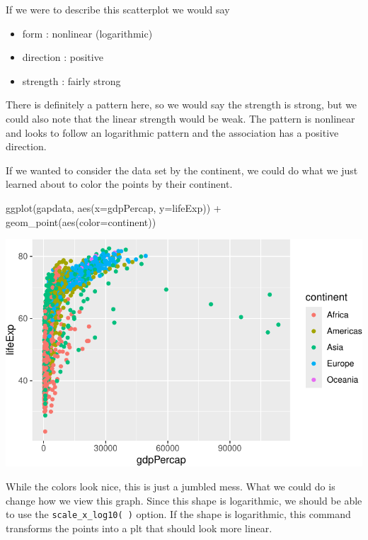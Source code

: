 \documentclass[
  letterpaper,
  DIV=11,
  numbers=noendperiod]{scrreprt}
\newenvironment{Shaded}{\begin{snugshade}}{\end{snugshade}}
\newcommand{\AttributeTok}[1]{\textcolor[rgb]{0.40,0.45,0.13}{#1}}
\newcommand{\FunctionTok}[1]{\textcolor[rgb]{0.28,0.35,0.67}{#1}}
\newcommand{\NormalTok}[1]{\textcolor[rgb]{0.00,0.23,0.31}{#1}}
\newcommand{\SpecialCharTok}[1]{\textcolor[rgb]{0.37,0.37,0.37}{#1}}
\providecommand{\tightlist}{%
  \setlength{\itemsep}{0pt}\setlength{\parskip}{0pt}}\usepackage{longtable,booktabs,array}
\begin{document}
If we were to describe this scatterplot we would say

\begin{itemize}
\tightlist
\item
  form : nonlinear (logarithmic)
\item
  direction : positive
\item
  strength : fairly strong
\end{itemize}

There is definitely a pattern here, so we would say the strength is
strong, but we could also note that the linear strength would be weak.
The pattern is nonlinear and looks to follow an logarithmic pattern and
the association has a positive direction.

If we wanted to consider the data set by the continent, we could do what
we just learned about to color the points by their continent.

\begin{Shaded}
\begin{Highlighting}[]
  \FunctionTok{ggplot}\NormalTok{(gapdata, }\FunctionTok{aes}\NormalTok{(}\AttributeTok{x=}\NormalTok{gdpPercap, }\AttributeTok{y=}\NormalTok{lifeExp)) }\SpecialCharTok{+}
  \FunctionTok{geom\_point}\NormalTok{(}\FunctionTok{aes}\NormalTok{(}\AttributeTok{color=}\NormalTok{continent))}
\end{Highlighting}
\end{Shaded}

\includegraphics{Advanced_Scatterplot_Techniques_files/figure-pdf/unnamed-chunk-15-1.pdf}

While the colors look nice, this is just a jumbled mess. What we could
do is change how we view this graph. Since this shape is logarithmic, we
should be able to use the \texttt{scale\_x\_log10(\ )} option. If the
shape is logarithmic, this command transforms the points into a plt that
should look more linear.
\end{document}
